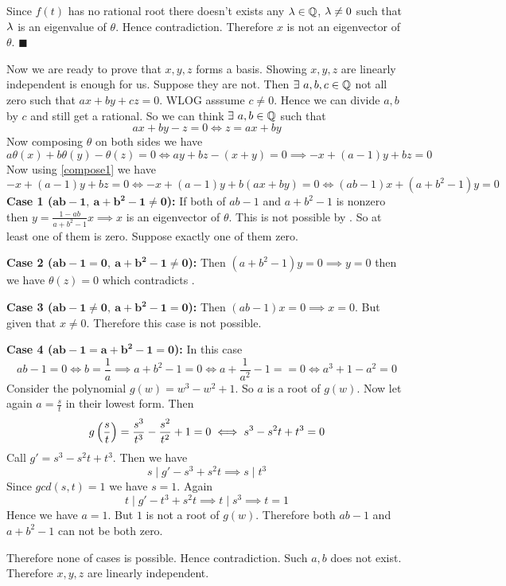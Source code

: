 \documentclass[a4paper, 11pt]{article}
\renewenvironment{proof}{\noindent{\it \textbf{Proof:}}\hspace*{1em}}{\hfill $\blacksquare$\bigskip\\}
\begin{document}
{\begin{proof}
	Since $f(t)$ has no rational root there doesn't exists any $\lambda\in\mathbb{Q}$, $\lambda\neq 0$ such that $\lambda$ is an eigenvalue of $\theta$. Hence contradiction. Therefore $x$ is not an eigenvector of $\theta$. 
\end{proof}

Now we are ready to prove that $x,y,z$ forms a basis. Showing $x,y,z$ are linearly independent is enough for us. Suppose they are not. Then $\exists\ a,b,c\in \mathbb{Q}$  not all zero such that $ax+by+cz=0$. WLOG asssume $c\neq 0$. Hence we can divide $a,b$ by $c$ and still get a rational. So we can think $\exists\ a,b\in \mathbb{Q}$ such that $$ax+by-z=0\iff z=ax+by$$ Now composing $\theta$ on both sides we have \begin{equation}
	a\theta(x)+b\theta(y)-\theta(z)=0\iff ay+bz-(x+y)=0\implies {-x+(a-1)y+bz=0}\label{compose1}
\end{equation}Now using \eqref{compose1} we have $$-x+(a-1)y+bz=0\iff -x+(a-1)y+b({ax+by})=0\iff (ab-1)x+(a+b^2-1)y=0$$\textbf{Case 1 ($\boldsymbol{ab-1,\ a+b^2-1\neq 0}$):} If both of $ab-1$ and $a+b^2-1$ is nonzero then $y=\frac{1-ab}{a+b^2-1}x\implies x$ is an eigenvector of $\theta$. This is not possible by .  So at least one of them is zero. Suppose exactly one of them zero.\vspace*{2mm} \parinf

\textbf{Case 2 ($\boldsymbol{ab-1=0,\ a+b^2-1\neq 0}$):} Then $(a+b^2-1)y=0\implies y=0$ then we have $ \theta(z)=0$ which contradicts .\vspace*{2mm}

\textbf{Case 3 ($\boldsymbol{ab-1\neq0,\ a+b^2-1= 0}$):} Then $(ab-1)x=0\implies x=0$. But given that $x\neq0$. Therefore this case is not possible.\vspace*{2mm}

\textbf{Case 4 ($\boldsymbol{ab-1=a+b^2-1=0}$):} In this case$$ab-1=0\iff b=\frac1a\implies a+b^2-1=0\iff a+\frac1{a^2}-1==0\iff a^3+1-a^2=0$$Consider the polynomial $g(w)=w^3-w^2+1$. So $a$ is a root of $g(w)$. Now let again $a=\frac{s}{t}$ in their lowest form. Then $$g\left(\frac{s}{t}\right)=\frac{s^3}{t^3}-\frac{s^2}{t^2}+1=0\iff s^3-s^2t+t^3=0$$Call $g'= s^3-s^2t+t^3$. Then we have $$s\mid g'-s^3+s^2t\implies s\mid t^3$$Since $gcd(s,t)=1$ we have $s=1$. Again $$t\mid g'-t^3+s^2t\implies t\mid s^3\implies t=1$$Hence we have $a=1$. But $1$ is not a root of $g(w)$. Therefore both $ab-1$ and $a+b^2-1$ can not be both zero. \parinn\vspace*{5mm}

Therefore none of cases is possible. Hence contradiction. Such $a,b$ does not exist. Therefore $x,y,z$ are linearly independent. 
}
\end{document}
